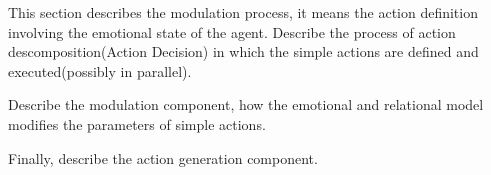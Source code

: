 This section describes the modulation process, it means the action definition involving the emotional state of the agent. 
Describe the process of action descomposition(Action Decision) in which the simple actions are defined and executed(possibly in parallel).

Describe the modulation component, how the emotional and relational model modifies the parameters of simple actions.

Finally, describe the action generation component.